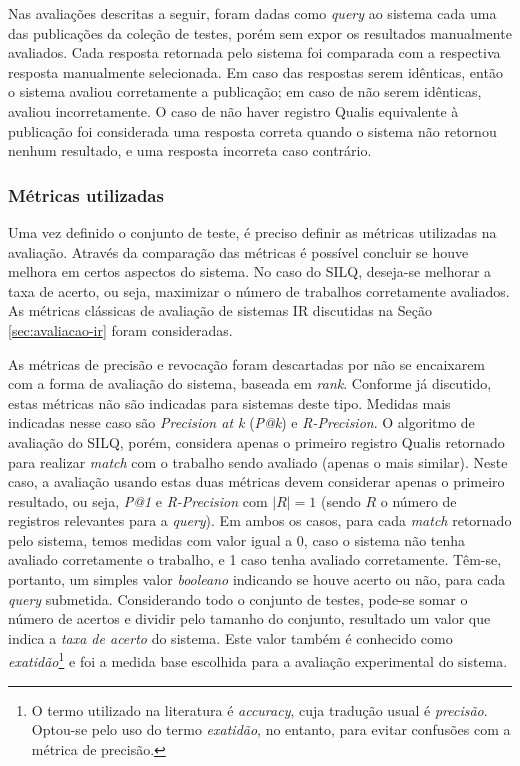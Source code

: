 \documentclass[12pt]{article}
\begin{document}
Nas avaliações descritas a seguir, foram dadas como \textit{query} ao sistema cada uma das publicações da coleção de testes, porém sem expor os resultados manualmente avaliados. Cada resposta retornada pelo sistema foi comparada com a respectiva resposta manualmente selecionada. Em caso das respostas serem idênticas, então o sistema avaliou corretamente a publicação; em caso de não serem idênticas, avaliou incorretamente. O caso de não haver registro Qualis equivalente à publicação foi considerada uma resposta correta quando o sistema não retornou nenhum resultado, e uma resposta incorreta caso contrário.

\subsubsection{Métricas utilizadas}

Uma vez definido o conjunto de teste, é preciso definir as métricas utilizadas na avaliação. Através da comparação das métricas é possível concluir se houve melhora em certos aspectos do sistema. No caso do SILQ, deseja-se melhorar a taxa de acerto, ou seja, maximizar o número de trabalhos corretamente avaliados. As métricas clássicas de avaliação de sistemas IR discutidas na Seção \ref{sec:avaliacao-ir} foram consideradas.

As métricas de precisão e revocação foram descartadas por não se encaixarem com a forma de avaliação do sistema, baseada em \textit{rank}. Conforme já discutido, estas métricas não são indicadas para sistemas deste tipo. Medidas mais indicadas nesse caso são \textit{Precision at k} (\textit{P@k}) e \textit{R-Precision}. O algoritmo de avaliação do SILQ, porém, considera apenas o primeiro registro Qualis retornado para realizar \textit{match} com o trabalho sendo avaliado (apenas o mais similar). Neste caso, a avaliação usando estas duas métricas devem considerar apenas o primeiro resultado, ou seja, \textit{P@1} e \textit{R-Precision} com $|R| = 1$ (sendo $R$ o número de registros relevantes para a \textit{query}). Em ambos os casos, para cada \textit{match} retornado pelo sistema, temos medidas com valor igual a 0, caso o sistema não tenha avaliado corretamente o trabalho, e 1 caso tenha avaliado corretamente. Têm-se, portanto, um simples valor \textit{booleano} indicando se houve acerto ou não, para cada \textit{query} submetida. Considerando todo o conjunto de testes, pode-se somar o número de acertos e dividir pelo tamanho do conjunto, resultado um valor que indica a \textit{taxa de acerto} do sistema. Este valor também é conhecido como \textit{exatidão}\footnote{O termo utilizado na literatura é \textit{accuracy}, cuja tradução usual é \textit{precisão}. Optou-se pelo uso do termo \textit{exatidão}, no entanto, para evitar confusões com a métrica de precisão.} e foi a medida base escolhida para a  avaliação experimental do sistema.
\end{document}
